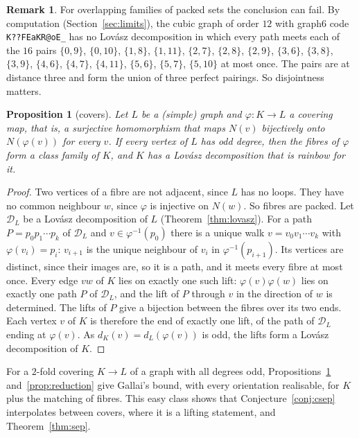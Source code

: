 \documentclass[11pt]{amsart}
\newtheorem{proposition}[theorem]{Proposition}
\theoremstyle{definition}
\newtheorem{remark}[theorem]{Remark}
\newcommand{\cD}{\mathcal D}
\begin{document}
\begin{remark}\label{rem:overlap}
For overlapping families of packed sets the conclusion can fail. By computation
(Section~\ref{sec:limits}), the cubic graph of order $12$ with graph6 code \texttt{K??FEaKR@oE\_} has no
Lov\'asz decomposition in which every path meets each of the $16$ pairs $\{0,9\}$, $\{0,10\}$,
$\{1,8\}$, $\{1,11\}$, $\{2,7\}$, $\{2,8\}$, $\{2,9\}$, $\{3,6\}$, $\{3,8\}$, $\{3,9\}$,
$\{4,6\}$, $\{4,7\}$, $\{4,11\}$, $\{5,6\}$, $\{5,7\}$, $\{5,10\}$ at most once. The pairs are at
distance three and form the union of three perfect pairings. So disjointness matters.
\end{remark}

\begin{proposition}[covers]\label{prop:cover}
Let $L$ be a (simple) graph and $\varphi:K\to L$ a covering map, that is, a surjective homomorphism that maps $N(v)$ bijectively
onto $N(\varphi(v))$ for every $v$. If every vertex of $L$ has odd degree, then the fibres of $\varphi$ form
a class family of $K$, and $K$ has a Lov\'asz decomposition that is rainbow for it.
\end{proposition}

\begin{proof}
Two vertices of a fibre are not adjacent, since $L$ has no loops. They have no common neighbour $w$,
since $\varphi$ is injective on $N(w)$. So fibres are packed. Let $\cD_L$ be a Lov\'asz decomposition of
$L$ (Theorem~\ref{thm:lovasz}). For a path $P=p_0p_1\cdots p_k$ of $\cD_L$ and $v\in\varphi^{-1}(p_0)$
there is a unique walk $v=v_0v_1\cdots v_k$ with $\varphi(v_i)=p_i$: $v_{i+1}$ is the unique neighbour of
$v_i$ in $\varphi^{-1}(p_{i+1})$. Its vertices are distinct, since their images are, so it is a path, and it
meets every fibre at most once. Every edge $vw$ of $K$ lies on exactly one such lift: $\varphi(v)\varphi(w)$
lies on exactly one path $P$ of $\cD_L$, and the lift of $P$ through $v$ in the direction of $w$ is
determined. The lifts of $P$ give a bijection between the fibres over its two ends. Each vertex $v$ of $K$
is therefore the end of exactly one lift, of the path of $\cD_L$ ending at $\varphi(v)$. As
$d_K(v)=d_L(\varphi(v))$ is odd, the lifts form a Lov\'asz decomposition of $K$.
\end{proof}

For a $2$-fold covering $K\to L$ of a graph with all degrees odd, Propositions~\ref{prop:cover}
and~\ref{prop:reduction} give Gallai's bound, with every orientation realisable, for $K$ plus the
matching of fibres. This easy class shows that Conjecture~\ref{conj:csep} interpolates between covers,
where it is a lifting statement, and Theorem~\ref{thm:sep}.
\end{document}
